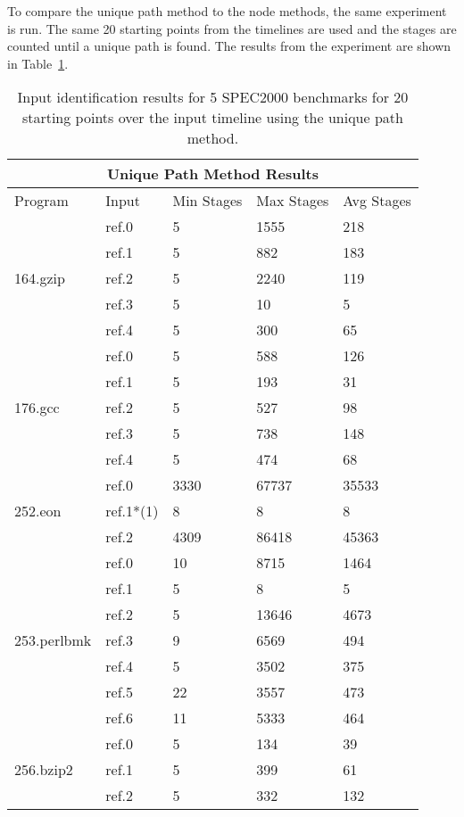 To compare the unique path method to the node methods, the same experiment
is run.  The same 20 starting points from the timelines are used and
the stages are counted until a unique path is found. The results
from the experiment are shown in Table~\ref{table:input_id_path_results}.

\begin{table}[t!]
\center
\begin{tabular}{|l|l|l|l|l|}
\hline
\multicolumn{5}{|c|}{Unique Path Method Results}\\
\hline
Program&Input&Min Stages&Max Stages&Avg Stages\\
\hline\hline
\multirow{5}{*}{164.gzip}
    &ref.0&5&1555&218\\
    &ref.1&5&882&183\\
    &ref.2&5&2240&119\\
    &ref.3&5&10&5\\
    &ref.4&5&300&65\\
\hline\hline
\multirow{5}{*}{176.gcc}
    &ref.0&5&588&126\\
    &ref.1&5&193&31\\
    &ref.2&5&527&98\\
    &ref.3&5&738&148\\
    &ref.4&5&474&68\\
\hline\hline
\multirow{3}{*}{252.eon}
    &ref.0&3330&67737&35533\\
    &ref.1*(1)&8&8&8\\
    &ref.2&4309&86418&45363\\
\hline\hline
\multirow{7}{*}{253.perlbmk}
    &ref.0&10&8715&1464\\
    &ref.1&5&8&5\\
    &ref.2&5&13646&4673\\
    &ref.3&9&6569&494\\
    &ref.4&5&3502&375\\
    &ref.5&22&3557&473\\
    &ref.6&11&5333&464\\
\hline\hline
\multirow{3}{*}{256.bzip2}
    &ref.0&5&134&39\\
    &ref.1&5&399&61\\
    &ref.2&5&332&132\\
\hline
\end{tabular}
\caption{Input identification results for 5 SPEC2000 benchmarks for 20 starting
points over the input timeline using the unique path method.}
\label{table:input_id_path_results}
\end{table}


